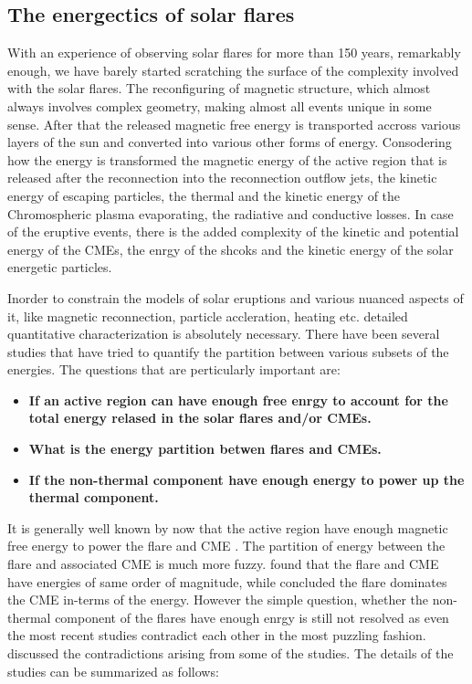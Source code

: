 \subsection{The energectics of solar flares}\label{sol_flr_energ}

With an experience of observing solar flares for more than 150 years, remarkably enough, we have barely started scratching the surface of the complexity involved with the solar flares. The reconfiguring of magnetic structure, which almost always involves complex geometry, making almost all events unique in some sense. After that the released magnetic free energy is transported accross various layers of the sun and converted into various other forms of energy. Consodering how the energy is transformed the magnetic energy of the active region that is released after the reconnection into the reconnection outflow jets, the kinetic energy of escaping particles, the thermal and the kinetic energy of the Chromospheric plasma evaporating, the radiative and conductive losses. In case of the eruptive events, there is the added complexity of the kinetic and potential energy of the CMEs, the enrgy of the shcoks and the kinetic energy of the solar energetic particles. 

Inorder to constrain the models of solar eruptions and various nuanced aspects of it, like magnetic reconnection, particle accleration, heating etc. detailed quantitative characterization is absolutely necessary. There have been several studies that have tried to quantify the partition between various subsets of the energies. The questions that are perticularly important are:

\begin{itemize}
    \item \textbf{If an active region can have enough free enrgy to account for the total energy relased in the solar flares and/or CMEs.}
    \item \textbf{What is the energy partition betwen flares and CMEs.}
    \item \textbf{If the non-thermal component have enough energy to power up the thermal component.}
\end{itemize}

It is generally well known by now that the active region have enough magnetic free energy to power the flare and CME \citep{emslie12,ash17}. The partition of energy between the flare and associated CME is much more fuzzy. \cite{emslie12} found that the flare and CME have energies of same order of magnitude, while \cite{ash17} concluded the flare dominates the CME in-terms of the energy. However the simple question, whether the non-thermal component of the flares have enough enrgy is still not resolved as even the most recent studies contradict each other in the most puzzling fashion. \cite{warmuth20} discussed the contradictions arising from some of the studies\citep{stosire07,emslie12,inglis14,warmuth16a,warmuth16b,ash17}. The details of the studies can be summarized as follows:

